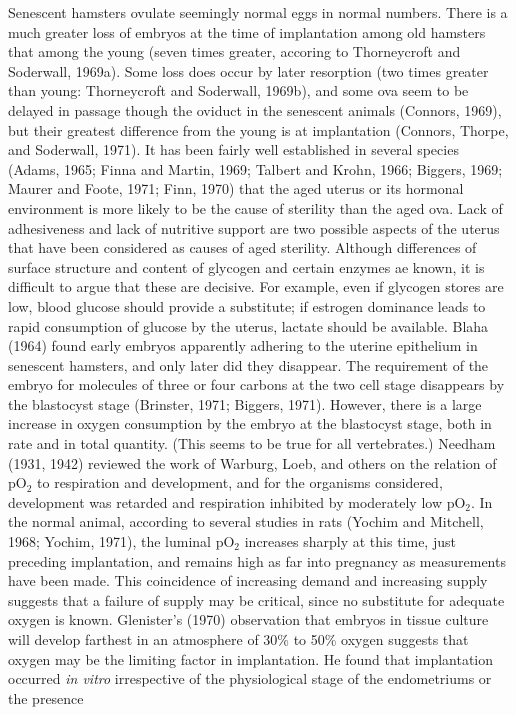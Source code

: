 Senescent hamsters ovulate seemingly normal eggs in normal numbers. There is a much greater loss of embryos at the time of implantation among old hamsters that among the young (seven times greater, accoring to Thorneycroft and Soderwall, 1969a). Some loss does occur by later resorption (two times greater than young: Thorneycroft and Soderwall, 1969b), and some
ova seem to be delayed in passage though the oviduct in the senescent animals (Connors, 1969), but their greatest difference from the young is at implantation (Connors, Thorpe, and Soderwall, 1971). It has been fairly well established in several species (Adams, 1965; Finna and Martin, 1969; Talbert and Krohn, 1966; Biggers, 1969; Maurer and Foote, 1971; Finn, 1970) that
the aged uterus or its hormonal environment is more likely to be the cause of sterility than the aged ova. Lack of adhesiveness and lack of nutritive support are two possible aspects of the uterus that have been considered as causes of aged sterility. Although differences of surface structure and content of glycogen and certain enzymes ae known, it is difficult to argue
that these are decisive. For example, even if glycogen stores are low, blood glucose should provide a substitute; if estrogen dominance leads to rapid consumption of glucose by the uterus, lactate should be available. Blaha (1964) found early embryos apparently adhering to the uterine epithelium in senescent hamsters, and only later did they disappear. The requirement of the
embryo for molecules of three or four carbons at the two cell stage disappears by the blastocyst stage (Brinster, 1971; Biggers, 1971). However, there is a large increase in oxygen consumption by the embryo at the blastocyst stage, both in rate and in total quantity. (This seems to be true for
all vertebrates.) Needham (1931, 1942) reviewed the work of Warburg, Loeb, and others on the relation of pO$_{2}$ to respiration and development, and for the organisms considered, development was retarded and respiration inhibited by moderately low pO$_{2}$. In the normal animal, according to several studies in
rats (Yochim and Mitchell, 1968; Yochim, 1971), the luminal pO$_{2}$ increases sharply at this time, just preceding implantation, and remains high as far into pregnancy as measurements have been made. This coincidence of increasing demand and increasing supply suggests that a failure of supply may be critical, since no substitute for
adequate oxygen is known. Glenister's (1970) observation that embryos in tissue culture will develop farthest in an atmosphere of 30\% to 50\% oxygen suggests that oxygen may be the limiting factor in implantation. He found that implantation occurred \textit{in vitro} irrespective of the physiological stage of the endometriums or the presence
